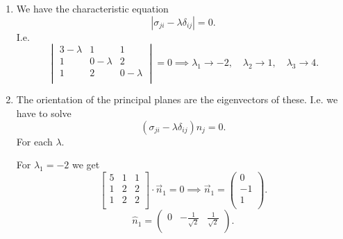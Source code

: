 \begin{derivation}
  \begin{enumerate}[label=(\alph*)]
    \item We have the characteristic equation
      \begin{equation*}
        \left| \sigma_{ji} - \lambda \delta_{ij} \right| = 0
      .\end{equation*}
      I.e.
      \begin{equation*}
        \begin{vmatrix}
          3 - \lambda & 1 & 1\\
        1 & 0 - \lambda & 2\\
        1 & 2 & 0 - \lambda\\
        \end{vmatrix} = 0 \implies \lambda_1\to -2, \quad\lambda_2\to 1, \quad\lambda_3\to 4
      .\end{equation*}
    \item The orientation of the principal planes are the eigenvectors of these. I.e. we have to solve
      \begin{equation*}
        \left( \sigma_{ji} - \lambda \delta_{ij} \right) n_j = 0 
      .\end{equation*}
      For each $\lambda$.

      For $\lambda_1 = -2$ we get
      \begin{equation*}
        \begin{bmatrix}
          5 & 1 & 1\\
        1 & 2 & 2\\
        1 & 2 & 2\\
        \end{bmatrix} \cdot \Vec{n}_1 = 0 \implies \Vec{n}_1 = \begin{pmatrix}
          0\\
        -1\\
        1\\
        \end{pmatrix}
      .\end{equation*}
      \begin{equation*}
        \hat{n}_1 = \begin{pmatrix}
          0 & - \frac{1}{\sqrt{2}} & \frac{1}{\sqrt{2}}\\
        \end{pmatrix}
      .\end{equation*}
      


\end{enumerate}
\end{derivation}
